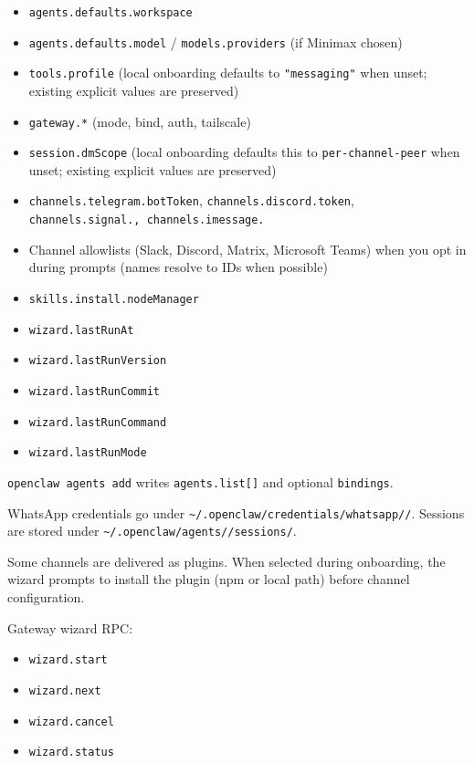 \begin{itemize}
  \item \texttt{agents.defaults.workspace}
  \item \texttt{agents.defaults.model} / \texttt{models.providers} (if Minimax chosen)
  \item \texttt{tools.profile} (local onboarding defaults to \texttt{"messaging"} when unset; existing explicit values are preserved)
  \item \texttt{gateway.*} (mode, bind, auth, tailscale)
  \item \texttt{session.dmScope} (local onboarding defaults this to \texttt{per-channel-peer} when unset; existing explicit values are preserved)
  \item \texttt{channels.telegram.botToken}, \texttt{channels.discord.token}, \texttt{channels.signal.\textit{}, \texttt{channels.imessage.}}
  \item Channel allowlists (Slack, Discord, Matrix, Microsoft Teams) when you opt in during prompts (names resolve to IDs when possible)
  \item \texttt{skills.install.nodeManager}
  \item \texttt{wizard.lastRunAt}
  \item \texttt{wizard.lastRunVersion}
  \item \texttt{wizard.lastRunCommit}
  \item \texttt{wizard.lastRunCommand}
  \item \texttt{wizard.lastRunMode}
\end{itemize}


\texttt{openclaw agents add} writes \texttt{agents.list[]} and optional \texttt{bindings}.

WhatsApp credentials go under \texttt{\textasciitilde{}/.openclaw/credentials/whatsapp//}.
Sessions are stored under \texttt{\textasciitilde{}/.openclaw/agents//sessions/}.

Some channels are delivered as plugins. When selected during onboarding, the wizard
prompts to install the plugin (npm or local path) before channel configuration.

Gateway wizard RPC:

\begin{itemize}
  \item \texttt{wizard.start}
  \item \texttt{wizard.next}
  \item \texttt{wizard.cancel}
  \item \texttt{wizard.status}
\end{itemize}


